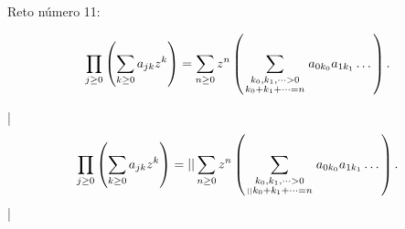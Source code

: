 

\bigskip

\enunciadoS Reto n\'umero 11:

$$\prod_{j\geq0}\left(\sum_{k\geq0}a_{jk}z^k\right)=
\sum_{n\geq0}z^n\left(
\sum_{\scriptstyle k_0,k_1,\dots>0\atop\scriptstyle k_0+k_1+\cdots=n} 
a_{0k_0}a_{1k_1}\dots\right).$$

\bigskip

\respuestaS

|$$\prod_{j\geq0}\left(\sum_{k\geq0}a_{jk}z^k\right)=|

|\sum_{n\geq0}z^n\left(\sum_{\scriptstyle k_0,k_1,\dots>0\atop|

|\scriptstyle k_0+k_1+\cdots=n}a_{0k_0}a_{1k_1}\dots\right).$$|

\bye

